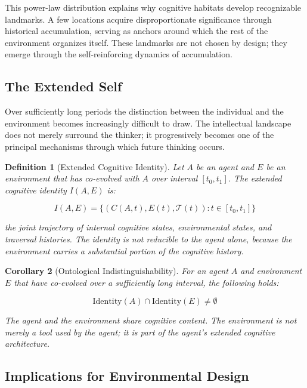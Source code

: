\documentclass[12pt,oneside]{article}
\newtheorem{definition}{Definition}[section]
\newtheorem{corollary}[definition]{Corollary}
\theoremstyle{remark}
\begin{document}
This power-law distribution explains why cognitive habitats develop recognizable landmarks. A few locations acquire disproportionate significance through historical accumulation, serving as anchors around which the rest of the environment organizes itself. These landmarks are not chosen by design; they emerge through the self-reinforcing dynamics of accumulation.

\subsection{The Extended Self}

Over sufficiently long periods the distinction between the individual and the environment becomes increasingly difficult to draw. The intellectual landscape does not merely surround the thinker; it progressively becomes one of the principal mechanisms through which future thinking occurs.

\begin{definition}[Extended Cognitive Identity]
Let $A$ be an agent and $E$ be an environment that has co-evolved with $A$ over interval $[t_0, t_1]$. The extended cognitive identity $I(A, E)$ is:

\begin{equation}
I(A, E) = \{(C(A, t), E(t), \mathcal{T}(t)) : t \in [t_0, t_1]\}
\end{equation}

the joint trajectory of internal cognitive states, environmental states, and traversal histories. The identity is not reducible to the agent alone, because the environment carries a substantial portion of the cognitive history.
\end{definition}

\begin{corollary}[Ontological Indistinguishability]
For an agent $A$ and environment $E$ that have co-evolved over a sufficiently long interval, the following holds:

\begin{equation}
\text{Identity}(A) \cap \text{Identity}(E) \neq \emptyset
\end{equation}

The agent and the environment share cognitive content. The environment is not merely a tool used by the agent; it is part of the agent's extended cognitive architecture.
\end{corollary}

\subsection{Implications for Environmental Design}
\end{document}
